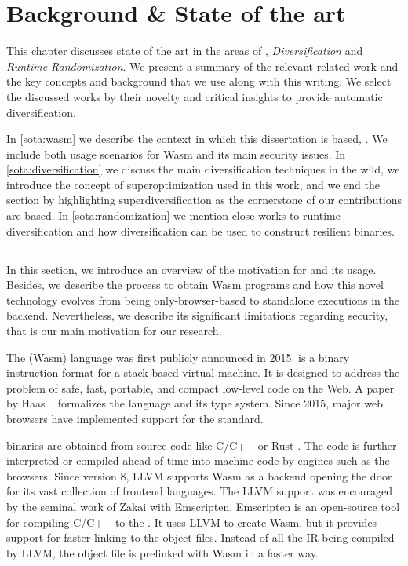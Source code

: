 \chapter{Background \& State of the art}

This chapter discusses state of the art in the areas of \emph{\wasm}, \emph{Diversification} and \emph{Runtime Randomization}. We present a summary of the relevant related work and the key concepts and background that we use along with this writing. 
We select the discussed works by their novelty and critical insights to provide automatic diversification. 

In \autoref{sota:wasm} we describe the context in which this dissertation is based, \wasm. We include both usage scenarios for Wasm and its main security issues. In \autoref{sota:diversification} we discuss the main diversification techniques in the wild, we introduce the concept of superoptimization used in this work, and we end the section by highlighting superdiversification as the cornerstone of our contributions are based. In \autoref{sota:randomization} we mention close works to runtime diversification and how diversification can be used to construct resilient binaries. 

\section{\wasm}
\label{sota:wasm}

In this section, we introduce an overview of the motivation for \wasm and its usage. Besides, we describe the process to obtain Wasm programs and how this novel technology evolves from being only-browser-based to standalone executions in the backend. Nevertheless, we describe its significant limitations regarding security, that is our main motivation for our research.

The \wasm (Wasm) language was first publicly announced in 2015. \wasm is a binary instruction format for a stack-based virtual machine.
It is designed to address the problem of safe, fast, portable, and compact low-level code on the Web.
A paper by Haas \etal~\cite{Haas_2017} formalizes the language and its type system.
Since 2015, major web browsers have implemented support for the standard.

\wasm binaries are obtained from source code like C/C++ or Rust \cite{Hilbig2021AnES}. The \wasm code is further interpreted or compiled ahead of time into machine code by engines such as the browsers. Since version 8, LLVM supports Wasm as a backend opening the door for its vast collection of frontend languages. The LLVM support was encouraged by the seminal work of Zakai \etal with Emscripten.
Emscripten is an open-source tool for compiling C/C++ to the \wasm. It uses LLVM to create Wasm, but it provides support for faster linking to the object files. Instead of all the IR being compiled by LLVM, the object file is prelinked with Wasm in a faster way. 

